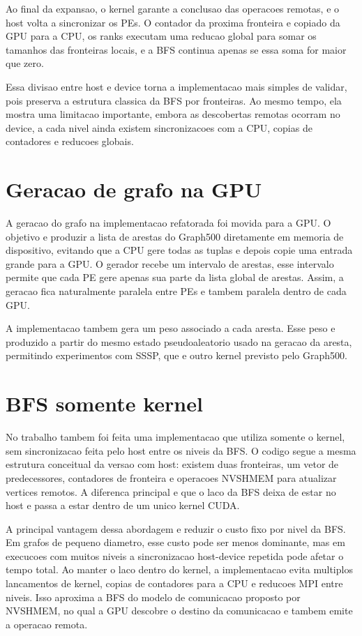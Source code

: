 Ao final da expansao, o kernel garante a conclusao das operacoes remotas, e o
host volta a sincronizar os PEs. O contador da proxima fronteira e copiado da
GPU para a CPU, os ranks executam uma reducao global para somar os tamanhos das
fronteiras locais, e a BFS continua apenas se essa soma for maior que zero.

Essa divisao entre host e device torna a implementacao mais simples de validar,
pois preserva a estrutura classica da BFS por fronteiras. Ao mesmo tempo, ela
mostra uma limitacao importante, embora as descobertas remotas ocorram no
device, a cada nivel ainda existem sincronizacoes com a CPU, copias de
contadores e reducoes globais.

\section{Geracao de grafo na GPU}
A geracao do grafo na implementacao refatorada foi movida para a GPU. O objetivo
e produzir a lista de arestas do Graph500 diretamente em memoria de dispositivo,
evitando que a CPU gere todas as tuplas e depois copie uma entrada grande para a
GPU. O gerador recebe um intervalo de arestas, esse
intervalo permite que cada PE gere apenas sua parte da lista global de arestas.
Assim, a geracao fica naturalmente paralela entre PEs e tambem paralela dentro
de cada GPU.

A implementacao tambem gera um peso associado a cada aresta. Esse peso e
produzido a partir do mesmo estado pseudoaleatorio usado na geracao da aresta,
permitindo experimentos com SSSP, que e outro kernel previsto pelo Graph500.

\section{BFS somente kernel}
No trabalho tambem foi feita uma implementacao que utiliza somente o kernel, sem
sincronizacao feita pelo host entre os niveis da BFS. O codigo segue a mesma
estrutura conceitual da versao com host: existem duas fronteiras, um vetor de
predecessores, contadores de fronteira e operacoes NVSHMEM para atualizar
vertices remotos. A diferenca principal e que o laco da BFS deixa de estar no
host e passa a estar dentro de um unico kernel CUDA.

A principal vantagem dessa abordagem e reduzir o custo fixo por nivel da BFS.
Em grafos de pequeno diametro, esse custo pode ser menos dominante, mas em
execucoes com muitos niveis a sincronizacao host-device repetida pode afetar o
tempo total. Ao manter o laco dentro do kernel, a implementacao evita multiplos
lancamentos de kernel, copias de contadores para a CPU e reducoes MPI entre
niveis. Isso aproxima a BFS do modelo de comunicacao proposto por NVSHMEM, no
qual a GPU descobre o destino da comunicacao e tambem emite a operacao remota.

